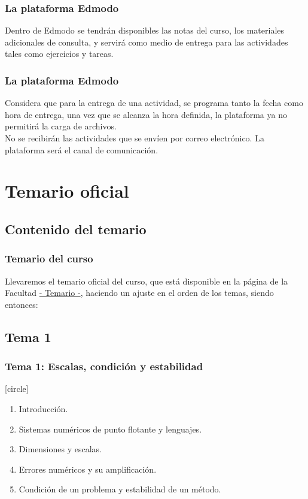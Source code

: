 \begin{frame}
\frametitle{La plataforma Edmodo}
Dentro de Edmodo se tendrán disponibles las notas del curso, los materiales adicionales de consulta, y servirá como medio de entrega para las actividades tales como ejercicios y tareas.
\end{frame}
\begin{frame}
\frametitle{La plataforma Edmodo}
Considera que para la entrega de una actividad, se programa tanto la fecha como hora de entrega, una vez que se alcanza la hora definida, la plataforma ya no permitirá la carga de archivos.
\\
\bigskip
\pause
No se recibirán las actividades que se envíen por correo electrónico. La plataforma será el canal de comunicación.
\end{frame}
\section{Temario oficial}
\subsection{Contenido del temario}
\begin{frame}
\frametitle{Temario del curso}
Llevaremos el temario oficial del curso, que está disponible en la página de la Facultad \href{http://www.fciencias.unam.mx/asignaturas/715.pdf}{- Temario -}, haciendo un ajuste en el orden de los temas, siendo entonces:
\end{frame}
\subsection*{Tema 1}
\begin{frame}
\frametitle{\textbf{Tema 1: Escalas, condición y estabilidad}}
[circle]
\begin{enumerate}[<+->]
\item Introducción.
\item Sistemas numéricos de punto flotante y lenguajes.
\item Dimensiones y escalas.
\item Errores numéricos y su amplificación.
\item Condición de un problema y estabilidad de un método.
\end{enumerate}
\end{frame}
